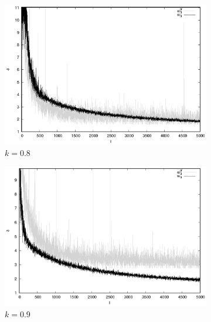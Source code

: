 \documentclass[tikz,10pt,a4paper]{article}
\begin{document}
\begin{figure}[h]
  \centering
  \begin{subfigure}[b]{0.35\textwidth}
    \includegraphics[width=\textwidth]{figs/levmar/comparison/comparison_5000_1000_xsigma0.80_float.txt_parameter3.eps}
	\caption{$k = 0.8$}
  \end{subfigure}%
  \begin{subfigure}[b]{0.35\textwidth}
    \includegraphics[width=\textwidth]{figs/levmar/comparison/comparison_5000_1000_xsigma0.90_float.txt_parameter3.eps}
	\caption{$k = 0.9$}
  \end{subfigure}%
  \begin{subfigure}[b]{0.35\textwidth}

\end{subfigure}
\end{figure}
\end{document}
